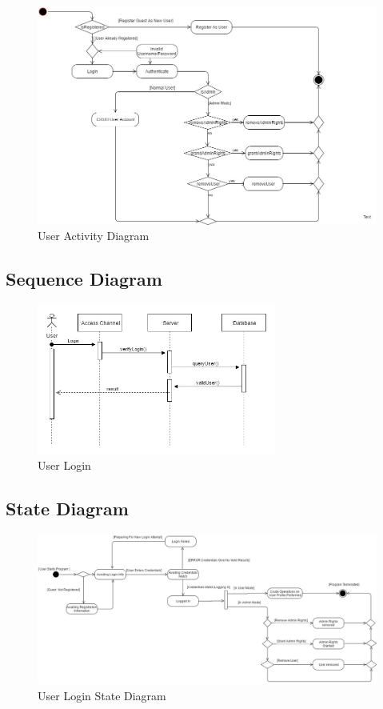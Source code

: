\begin{figure}[H]
		\centering
		\includegraphics[width=\textwidth]{user/img/UserActivityDiagram.jpg}
		\caption{User Activity Diagram}
\end{figure}


\subsection{Sequence Diagram}

\begin{figure}[H]
		\centering
		\includegraphics[width=0.7\textwidth]{user/img/UserSequence.jpg}
		\caption{User Login}
\end{figure}



\subsection{State Diagram}

\begin{figure}[H]
		\centering
		\includegraphics[width=\textwidth]{user/img/UserStateDiagram.jpg}
		\caption{User Login State Diagram}
\end{figure}




